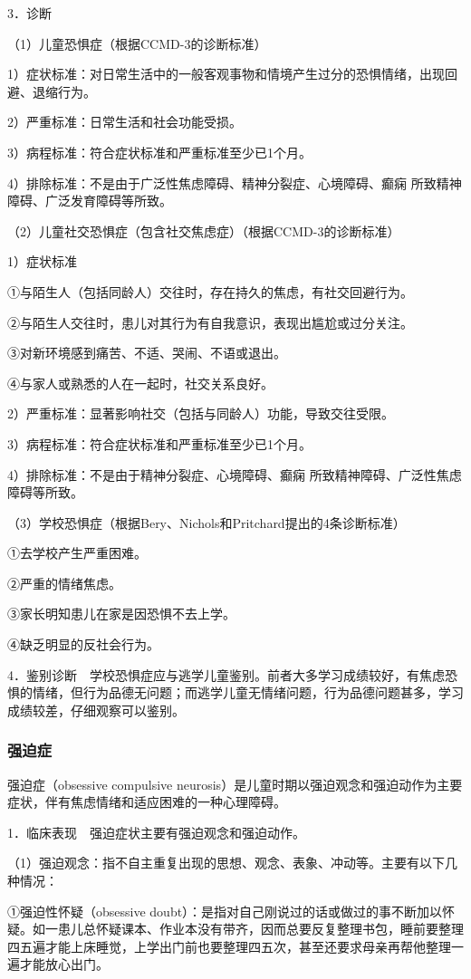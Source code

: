 3．诊断

（1）儿童恐惧症（根据CCMD-3的诊断标准）

1）症状标准：对日常生活中的一般客观事物和情境产生过分的恐惧情绪，出现回避、退缩行为。

2）严重标准：日常生活和社会功能受损。

3）病程标准：符合症状标准和严重标准至少已1个月。

4）排除标准：不是由于广泛性焦虑障碍、精神分裂症、心境障碍、癫痫
所致精神障碍、广泛发育障碍等所致。

（2）儿童社交恐惧症（包含社交焦虑症）（根据CCMD-3的诊断标准）

1）症状标准

①与陌生人（包括同龄人）交往时，存在持久的焦虑，有社交回避行为。

②与陌生人交往时，患儿对其行为有自我意识，表现出尴尬或过分关注。

③对新环境感到痛苦、不适、哭闹、不语或退出。

④与家人或熟悉的人在一起时，社交关系良好。

2）严重标准：显著影响社交（包括与同龄人）功能，导致交往受限。

3）病程标准：符合症状标准和严重标准至少已1个月。

4）排除标准：不是由于精神分裂症、心境障碍、癫痫
所致精神障碍、广泛性焦虑障碍等所致。

（3）学校恐惧症（根据Bery、Nichols和Pritchard提出的4条诊断标准）

①去学校产生严重困难。

②严重的情绪焦虑。

③家长明知患儿在家是因恐惧不去上学。

④缺乏明显的反社会行为。

4．鉴别诊断　学校恐惧症应与逃学儿童鉴别。前者大多学习成绩较好，有焦虑恐惧的情绪，但行为品德无问题；而逃学儿童无情绪问题，行为品德问题甚多，学习成绩较差，仔细观察可以鉴别。

\subsubsection{强迫症}

强迫症（obsessive compulsive
neurosis）是儿童时期以强迫观念和强迫动作为主要症状，伴有焦虑情绪和适应困难的一种心理障碍。

1．临床表现　强迫症状主要有强迫观念和强迫动作。

（1）强迫观念：指不自主重复出现的思想、观念、表象、冲动等。主要有以下几种情况：

①强迫性怀疑（obsessive
doubt）：是指对自己刚说过的话或做过的事不断加以怀疑。如一患儿总怀疑课本、作业本没有带齐，因而总要反复整理书包，睡前要整理四五遍才能上床睡觉，上学出门前也要整理四五次，甚至还要求母亲再帮他整理一遍才能放心出门。

